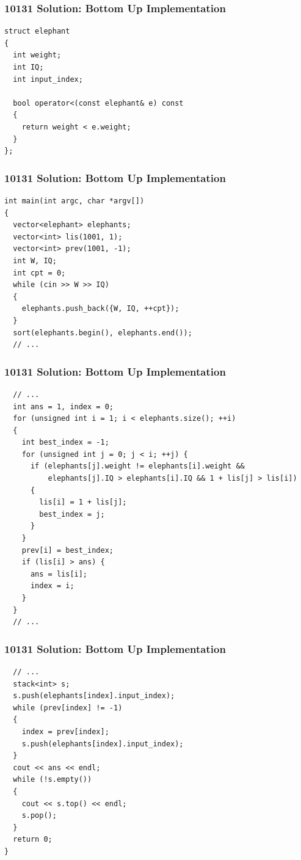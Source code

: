 \documentclass{beamer}
\begin{document}
\begin{frame}[containsverbatim]
\frametitle{10131 Solution: Bottom Up Implementation}
\scriptsize

\begin{lstlisting}
struct elephant
{
  int weight;
  int IQ;
  int input_index;

  bool operator<(const elephant& e) const
  {
    return weight < e.weight;
  }
};
\end{lstlisting}

\end{frame}

\begin{frame}[containsverbatim]
\frametitle{10131 Solution: Bottom Up Implementation}
\scriptsize

\begin{lstlisting}
int main(int argc, char *argv[])
{
  vector<elephant> elephants;
  vector<int> lis(1001, 1);
  vector<int> prev(1001, -1);
  int W, IQ;
  int cpt = 0;
  while (cin >> W >> IQ)
  {
    elephants.push_back({W, IQ, ++cpt});
  }
  sort(elephants.begin(), elephants.end());
  // ...
\end{lstlisting}

\end{frame}

\begin{frame}[containsverbatim]
\frametitle{10131 Solution: Bottom Up Implementation}
\scriptsize

\begin{lstlisting}
  // ...
  int ans = 1, index = 0;
  for (unsigned int i = 1; i < elephants.size(); ++i)
  {
    int best_index = -1;
    for (unsigned int j = 0; j < i; ++j) {
      if (elephants[j].weight != elephants[i].weight &&
          elephants[j].IQ > elephants[i].IQ && 1 + lis[j] > lis[i])
      {
        lis[i] = 1 + lis[j];
        best_index = j;
      }
    }
    prev[i] = best_index;
    if (lis[i] > ans) {
      ans = lis[i];
      index = i;
    }
  }
  // ...
\end{lstlisting}

\end{frame}

\begin{frame}[containsverbatim]
\frametitle{10131 Solution: Bottom Up Implementation}
\scriptsize

\begin{lstlisting}
  // ...
  stack<int> s;
  s.push(elephants[index].input_index);
  while (prev[index] != -1)
  {
    index = prev[index];
    s.push(elephants[index].input_index);
  }
  cout << ans << endl;
  while (!s.empty())
  {
    cout << s.top() << endl;
    s.pop();
  }
  return 0;
}
\end{lstlisting}

\end{frame}
\end{document}
